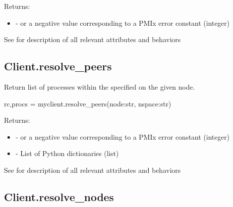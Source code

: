 \begin{arglist}
\end{arglist}

Returns:

\begin{itemize}
    \item {} -  or a negative value corresponding to a PMIx error constant (integer)
\end{itemize}


See  for description of all relevant attributes and behaviors


\subsection{Client.resolve_peers}

\summary

Return list of processes within the specified  on the given node.

\format

\pyspecificstart
\begin{codepar}
rc,procs = myclient.resolve_peers(node:str, nspace:str)
\end{codepar}
\pyspecificend

\begin{arglist}
\end{arglist}

Returns:

\begin{itemize}
    \item {} -  or a negative value corresponding to a PMIx error constant (integer)
    \item {} - List of Python  dictionaries (list)
\end{itemize}


See  for description of all relevant attributes and behaviors


\subsection{Client.resolve_nodes}

